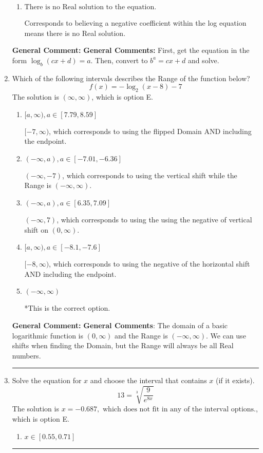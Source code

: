\documentclass{extbook}[14pt]
\newcommand{\litem}[1]{\item #1

\rule{\textwidth}{0.4pt}}
\begin{document}
\begin{enumerate}
{\begin{enumerate}[label=\Alph*.]
$x = -5.667$, which corresponds to ignoring the vertical shift when converting to exponential form.
\item \( \text{There is no Real solution to the equation.} \)

Corresponds to believing a negative coefficient within the log equation means there is no Real solution.
\end{enumerate}

\textbf{General Comment:} \textbf{General Comments:} First, get the equation in the form $\log_b{(cx+d)} = a$. Then, convert to $b^a = cx+d$ and solve.
}
\litem{
Which of the following intervals describes the Range of the function below?
\[ f(x) = -\log_2{(x-8)}-7 \]The solution is \( (\infty, \infty) \), which is option E.\begin{enumerate}[label=\Alph*.]
\item \( [a, \infty), a \in [7.79, 8.59] \)

$[-7, \infty)$, which corresponds to using the flipped Domain AND including the endpoint.
\item \( (-\infty, a), a \in [-7.01, -6.36] \)

$(-\infty, -7)$, which corresponds to using the vertical shift while the Range is $(-\infty, \infty)$.
\item \( (-\infty, a), a \in [6.35, 7.09] \)

$(-\infty, 7)$, which corresponds to using the using the negative of vertical shift on $(0, \infty)$.
\item \( [a, \infty), a \in [-8.1, -7.6] \)

$[-8, \infty)$, which corresponds to using the negative of the horizontal shift AND including the endpoint.
\item \( (-\infty, \infty) \)

*This is the correct option.
\end{enumerate}

\textbf{General Comment:} \textbf{General Comments}: The domain of a basic logarithmic function is $(0, \infty)$ and the Range is $(-\infty, \infty)$. We can use shifts when finding the Domain, but the Range will always be all Real numbers.
}
\litem{
 Solve the equation for $x$ and choose the interval that contains $x$ (if it exists).
\[  13 = \sqrt[3]{\frac{9}{e^{8x}}} \]The solution is \( x = -0.687, \text{ which does not fit in any of the interval options.} \), which is option E.\begin{enumerate}[label=\Alph*.]
\item \( x \in [0.55, 0.71] \)


\end{enumerate}}
\end{enumerate}
\end{document}
